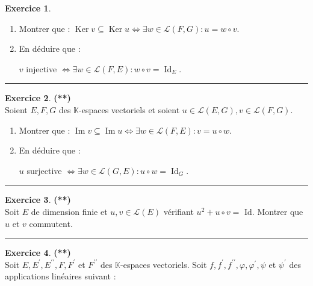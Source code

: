 \documentclass[a4paper,11pt]{article}
\theoremstyle{definition}
\newtheorem{exo}{Exercice} %
\begin{document}
\begin{minipage}{1\linewidth}
\begin{minipage}[t]{0.48\linewidth}
\begin{exo}
			\begin{enumerate}
			\item Montrer que : $\operatorname{Ker} v \subseteq \operatorname{Ker} u \Leftrightarrow \exists w \in \mathcal{L}(F, G): u=w \circ v$.
			\item En déduire que : 
			
			$v$ injective $\Leftrightarrow \exists w \in \mathcal{L}(F, E): w \circ v=\operatorname{Id}_{E}$.
		\end{enumerate}
			
		\centering\rule{1\linewidth}{0.6pt}\end{exo}
		
		\begin{exo}\textbf{(**)}\quad\\[0.2cm]
		Soient $E, F, G$ des $\mathbb{K}$-espaces vectoriels et soient $u \in \mathcal{L}(E, G), v \in \mathcal{L}(F, G)$.
		
		\begin{enumerate}
			\item Montrer que : $\operatorname{Im} v \subseteq \operatorname{Im} u \Leftrightarrow \exists w \in \mathcal{L}(F, E): v=u \circ w$.
			\item En déduire que :
			
			 $u$ surjective $\Leftrightarrow \exists w \in \mathcal{L}(G, E): u \circ w=\operatorname{Id}_{G}$.
		\end{enumerate}
			
		\centering\rule{1\linewidth}{0.6pt}\end{exo}
	
	
	\end{minipage}\hfill\vrule\hfill\begin{minipage}[t]{0.48\linewidth}\raggedright
		
		\begin{exo}\textbf{(**)}\quad\\[0.2cm]
		Soit $E$ de dimension finie et $u, v \in \mathscr{L}(E)$ vérifiant $u^{2}+u \circ v=$ Id. Montrer que $u$ et $v$ commutent.
		
		\centering\rule{1\linewidth}{0.6pt}\end{exo}
		
		\begin{exo}\textbf{(**)}\quad\\[0.2cm]
		Soit $E, E^{\prime}, E^{\prime \prime}, F, F^{\prime}$ et $F^{\prime \prime}$ des $\mathbb{K}$-espaces vectoriels. Soit $f, f^{\prime}, f^{\prime \prime}, \varphi, \varphi^{\prime}, \psi$ et $\psi^{\prime}$ des applications linéaires suivant :
		

\end{exo}
\end{minipage}
\end{minipage}
\end{document}
